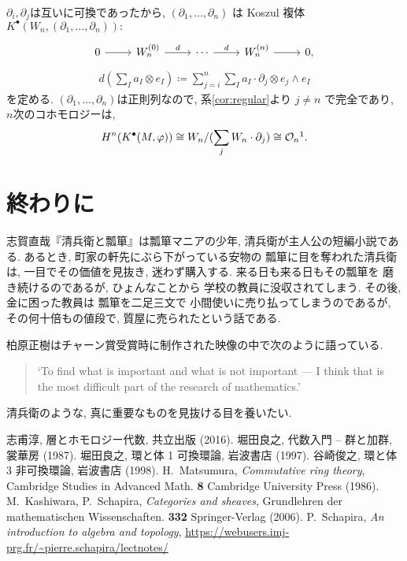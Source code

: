 \documentclass[11pt, a4paper, dvipdfmx]{jsarticle}
\theoremstyle{definition}
\newcommand{\mcal}{\mathcal}
\newcommand{\p}{\partial}
\newcommand{\pphi}{\varphi} %
\numberwithin{equation}{section}
\begin{document}
$\p_i,\p_j$は互いに可換であったから, 
$(\p_1,\ldots,\p_n)$
は Koszul 複体
$K^\bullet(W_n,(\p_1,\ldots,\p_n)):$
\begin{equation*}
    \begin{tikzcd}
        0\arrow[left]{r}& W_n^{(0)} \arrow[left]{r}{d}&
        \cdots
        \arrow[left]{r}{d}& W_n^{(n)}\arrow[left]{r}&0,
    \end{tikzcd}
\end{equation*}
\begin{align*}
    d(\sum_I a_I\otimes e_I)
    \coloneqq \sum_{j=i}^n \sum_I 
    a_I\cdot \p_j\otimes e_j\wedge e_I
\end{align*}
を定める. 
$(\p_1,\ldots,\p_n)$は正則列なので, 
系\ref{cor:regular}より
$j\neq n$ で完全であり, $n$次のコホモロジーは, 
\begin{align*}
    H^n(K^\bullet(M,\pphi)) 
    \cong W_n/(\sum_j W_n \cdot\p_j )
    \cong \mcal{O}_n\footnotemark.
\end{align*}

\section{終わりに}

志賀直哉『清兵衛と瓢箪』は瓢箪マニアの少年, 
清兵衛が主人公の短編小説である. 
あるとき, 町家の軒先にぶら下がっている安物の
瓢箪に目を奪われた清兵衛は, 一目でその価値を見抜き, 
迷わず購入する. 来る日も来る日もその瓢箪を
磨き続けるのであるが, ひょんなことから
学校の教員に没収されてしまう. 
その後, 金に困った教員は
瓢箪を二足三文で
小間使いに売り払ってしまうのであるが, 
その何十倍もの値段で, 質屋に売られたという話である. 

柏原正樹はチャーン賞受賞時に制作された映像の中で次のように語っている. 
\begin{quotation}
    `To find what is important and what is not important 
    --- I think that is the most difficult part 
    of the research of mathematics.'
\end{quotation}
清兵衛のような, 真に重要なものを見抜ける目を養いたい. 

\begin{thebibliography}{20} 
     志甫淳, 層とホモロジー代数, 共立出版 (2016). 
     堀田良之, 代数入門 -- 群と加群, 裳華房 (1987).
     堀田良之, 環と体 1 可換環論, 岩波書店 (1997).
     谷崎俊之, 環と体 3 非可換環論, 岩波書店 (1998).
     H.\ Matsumura, 
    \emph{Commutative ring theory}, 
    Cambridge Studies in Advanced Math. 
    \textbf{8} Cambridge University Press (1986).
     M.\ Kashiwara, P.\ Schapira, 
    \emph{Categories and sheaves}, 
    Grundlehren der mathematischen Wissenschaften. 
    \textbf{332} Springer-Verlag (2006).
     P.\ Schapira, 
    \emph{An introduction to algebra and topology}, 
    \url{https://webusers.imj-prg.fr/~pierre.schapira/lectnotes/}
\end{thebibliography}

\end{document}
